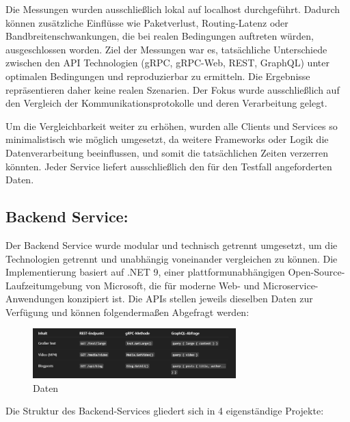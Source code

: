 Die Messungen wurden ausschließlich lokal auf localhost durchgeführt. Dadurch können zusätzliche Einflüsse wie Paketverlust, Routing-Latenz oder Bandbreitenschwankungen, die bei realen Bedingungen auftreten würden, ausgeschlossen worden. Ziel der Messungen war es, tatsächliche Unterschiede zwischen den API Technologien (gRPC, gRPC-Web, REST, GraphQL) unter optimalen Bedingungen und reproduzierbar zu ermitteln.
Die Ergebnisse repräsentieren daher keine realen Szenarien. Der Fokus wurde ausschließlich auf den Vergleich der Kommunikationsprotokolle und deren Verarbeitung gelegt.

Um die Vergleichbarkeit weiter zu erhöhen, wurden alle Clients und Services so minimalistisch wie möglich umgesetzt, da weitere Frameworks oder Logik die Datenverarbeitung beeinflussen, und somit die tatsächlichen Zeiten verzerren könnten.
Jeder Service liefert ausschließlich den für den Testfall angeforderten Daten. 

\subsection{Backend Service:}

Der Backend Service wurde modular und technisch getrennt umgesetzt, um die Technologien getrennt und unabhängig voneinander vergleichen zu können. Die Implementierung basiert auf .NET 9, einer plattformunabhängigen Open-Source-Laufzeitumgebung von Microsoft, die für moderne Web- und Microservice-Anwendungen konzipiert ist.
Die APIs stellen jeweils dieselben Daten zur Verfügung und können folgendermaßen Abgefragt werden:

\begin{figure}[htbp]
	\centering
	\includegraphics[width=0.7\textwidth]{images/prakt1.png}
	\caption{Daten}
\end{figure}

Die Struktur des Backend-Services gliedert sich in 4 eigenständige Projekte:

